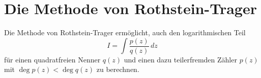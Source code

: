 %
%
%
\section{Die Methode von Rothstein-Trager
\label{buch:ratint:section:rothsteintrager}}
%
Die Methode von Rothstein-Trager ermöglicht, auch den logarithmischen
Teil
\begin{equation}
I
=
\int
\frac{p(z)}{q(z)}
\,dz
\label{buch:ratint:rothsteintrager:eqn:integral}
\end{equation}
für einen quadratfreien Nenner $q(z)$ und einen dazu teilerfremden
Zähler $p(z)$ mit $\deg p(z)<\deg q(z)$ zu berechnen.




